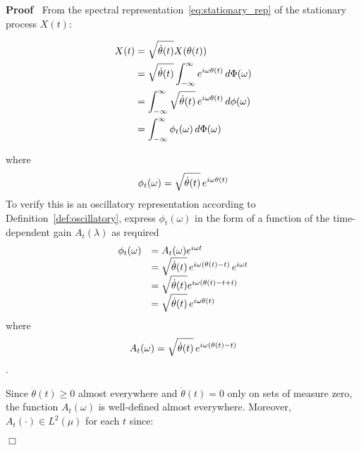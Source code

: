 \documentclass{article}
\newcommand{\cdummy}{\cdot}
\newenvironment{proof}{\noindent\textbf{Proof\ }}{\hspace*{\fill}$\Box$\medskip}
\begin{document}
\begin{proof}
  From the spectral representation~\eqref{eq:stationary_rep} of the stationary
  process $X (t)$:
  
  \begin{align}
    X (t) & = \sqrt{\dot{\theta} (t)} X (\theta (t)) \\
    & = \sqrt{\dot{\theta} (t)}  \int_{- \infty}^{\infty} e^{i \omega \theta
    (t)}  \hspace{0.17em} d \Phi (\omega) \\
    & = \int_{- \infty}^{\infty} \sqrt{\dot{\theta} (t)}  \hspace{0.17em}
    e^{i \omega \theta (t)}  \hspace{0.17em} d \phi (\omega) \\
    & = \int_{- \infty}^{\infty} \phi_t (\omega)  \hspace{0.17em} d \Phi
    (\omega) 
  \end{align}
  
  where
  \begin{equation}
    \phi_t (\omega) = \sqrt{\dot{\theta} (t)}  \hspace{0.17em} e^{i \omega
    \theta (t)}
  \end{equation}
  To verify this is an oscillatory representation according to
  Definition~\ref{def:oscillatory}, express $\phi_t (\omega)$ in the form of a
  function of the time-dependent gain $A_t (\lambda)$ as required
  \begin{equation}
    \begin{array}{ll}
      \phi_t (\omega) & = A_t (\omega) e^{i \omega t}\\
      & = \sqrt{\dot{\theta} (t)}  \hspace{0.17em} e^{i \omega (\theta (t) -
      t)}  \hspace{0.17em} e^{i \omega t}\\
      & = \sqrt{\dot{\theta} (t)} e^{i \omega (\theta (t) - t + t)}\\
      & = \sqrt{\dot{\theta} (t)}  \hspace{0.17em} e^{i \omega \theta (t)}
    \end{array}
  \end{equation}
  where
  \begin{equation}
    A_t (\omega) = \sqrt{\dot{\theta} (t)}  \hspace{0.17em} e^{i \omega
    (\theta (t) - t)}
  \end{equation}
  .
  
  Since $\dot{\theta} (t) \geq 0$ almost everywhere and $\dot{\theta} (t) = 0$
  only on sets of measure zero, the function $A_t (\omega)$ is well-defined
  almost everywhere. Moreover, $A_t (\cdummy) \in L^2 (\mu)$ for each $t$
  since:
  

\end{proof}
\end{document}
